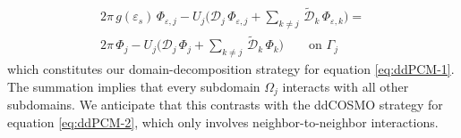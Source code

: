 \begin{multline}\label{eq:1}
2\pi \, g(\varepsilon_s) \, \Phi_{\varepsilon,j} - U_j \bigg( {\mathcal{D}}_j \, \Phi_{\varepsilon,j} + \sum_{k \ne j} \, \tilde{\mathcal{D}}_{k} \, \Phi_{\varepsilon,k}  \bigg) = \\ 2 \pi \, {\Phi_j} - U_j \bigg( {\mathcal{D}}_j \,\Phi_{j} + \sum_{k \ne j} \, \tilde{\mathcal{D}}_{k} \, \Phi_{k}  \bigg) \qquad \text{on }\Gamma_j
\end{multline}
which constitutes our domain-decomposition strategy for equation \eqref{eq:ddPCM-1}. The summation implies that every subdomain $\Omega_j$ interacts with all other subdomains. We anticipate that this contrasts with the ddCOSMO strategy for equation \eqref{eq:ddPCM-2}, which only involves neighbor-to-neighbor interactions.

